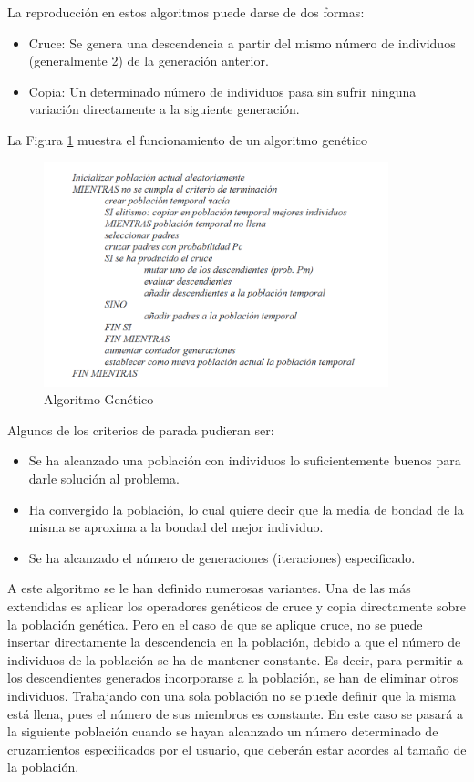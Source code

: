 \documentclass[a4paper,12pt]{book}
\begin{document}
		La reproducción en estos algoritmos puede darse de dos formas:
		\begin{itemize}
			\item Cruce: Se genera una descendencia a partir del mismo número de individuos (generalmente 2) de la generación anterior. 
			\item Copia: Un determinado número de individuos pasa sin sufrir ninguna variación directamente a la siguiente generación.
		\end{itemize}
	
		La Figura \ref{AlgoritmoeGenetico} muestra el funcionamiento de un algoritmo genético
	
		\begin{figure}[h]
			\centering
			\includegraphics[width=10cm]{./Graphics/AlgoritmoGenetico.png}
			\caption{Algoritmo Genético}
			\label{AlgoritmoeGenetico}
		\end{figure}
	
		Algunos de los criterios de parada pudieran ser:
		\begin{itemize}
			\item Se ha alcanzado una población con individuos lo suficientemente buenos para darle solución al problema.
			\item Ha convergido la población, lo cual quiere decir que la  media  de  bondad  de  la  misma  se aproxima a la bondad del mejor individuo.
			\item Se ha alcanzado el número de generaciones (iteraciones) especificado.
		\end{itemize}
	
		A este algoritmo se le han definido numerosas variantes. Una de las más extendidas es aplicar los operadores genéticos de cruce y copia directamente sobre la población genética. Pero en el caso de que se aplique cruce, no se puede insertar directamente la descendencia en la población, debido a que el número de individuos de la población se ha de mantener constante. Es decir, para permitir a los descendientes generados incorporarse a la población, se  han  de  eliminar  otros individuos. Trabajando con una sola población no se puede definir que la misma está llena, pues el número de sus miembros es constante. En este caso se pasará a la siguiente población cuando se hayan alcanzado un número determinado de cruzamientos especificados por el usuario, que deberán estar acordes al tamaño de la población.
		
\end{document}
